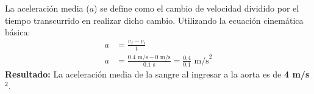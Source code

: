 \documentclass[12pt]{article}
\begin{document}
\begin{tcolorbox}
\begin{center}
    \end{center}

    \vspace{0.4cm}
    \begin{tcolorbox}[colback=medteal!10, colframe=medteal, arc=2mm, boxrule=1.2pt, title=\textbf{Desarrollo Matemático y Solución}]
        La aceleración media ($a$) se define como el cambio de velocidad dividido por el tiempo transcurrido en realizar dicho cambio. Utilizando la ecuación cinemática básica:
        \begin{align*}
            a &= \frac{v_f - v_i}{t} \\[1ex]
            a &= \frac{0.4 \text{ m/s} - 0 \text{ m/s}}{0.1 \text{ s}} = \frac{0.4}{0.1} \text{ m/s}^2
        \end{align*}
        \textbf{Resultado:} La aceleración media de la sangre al ingresar a la aorta es de \textbf{4 m/s$^2$}.
    \end{tcolorbox}
    
\end{tcolorbox}
\end{document}

